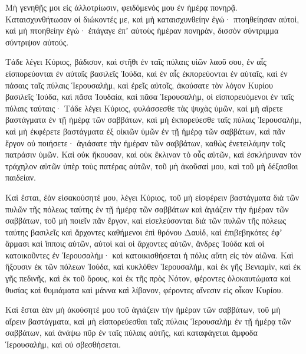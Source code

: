 {Μὴ γενηθῇς μοι εἰς ἀλλοτρίωσιν, φειδόμενός μου ἐν ἡμέρᾳ πονηρᾷ.
Καταισχυνθήτωσαν οἱ διώκοντές με, καὶ μὴ καταισχυνθείην ἐγώ· πτοηθείησαν αὐτοὶ, καὶ μὴ πτοηθείην ἐγώ· ἐπάγαγε ἐπʼ αὐτοὺς ἡμέραν πονηρὰν, δισσὸν σύντριμμα σύντριψον αὐτούς.
\par }{\PP {}Τάδε λέγει Κύριος, βάδισον, καὶ στῆθι ἐν ταῖς πύλαις υἱῶν λαοῦ σου, ἐν αἷς εἰσπορεύονται ἐν αὐταῖς βασιλεῖς Ἰούδα, καὶ ἐν αἷς ἐκπορεύονται ἐν αὐταῖς, καὶ ἐν πάσαις ταῖς πύλαις Ἱερουσαλὴμ,
καὶ ἐρεῖς αὐτοῖς, ἀκούσατε τὸν λόγον Κυρίου βασιλεῖς Ἰούδα, καὶ πᾶσα Ἰουδαία, καὶ πᾶσα Ἱερουσαλὴμ, οἱ εἰσπορευόμενοι ἐν ταῖς πύλαις ταύταις·
Τάδε λέγει Κύριος, φυλάσσεσθε τὰς ψυχὰς ὑμῶν, καὶ μὴ αἴρετε βαστάγματα ἐν τῇ ἡμέρᾳ τῶν σαββάτων, καὶ μὴ ἐκπορεύεσθε ταῖς πύλαις Ἱερουσαλὴμ,
καὶ μὴ ἐκφέρετε βαστάγματα ἐξ οἰκιῶν ὑμῶν ἐν τῇ ἡμέρᾳ τῶν σαββάτων, καὶ πᾶν ἔργον οὐ ποιήσετε· ἁγιάσατε τὴν ἡμέραν τῶν σαββάτων, καθὼς ἐνετειλάμην τοῖς πατράσιν ὑμῶν. Καὶ οὐκ ἤκουσαν, καὶ οὐκ ἔκλιναν τὸ οὖς αὐτῶν,
καὶ ἐσκλήρυναν τὸν τράχηλον αὐτῶν ὑπὲρ τοὺς πατέρας αὐτῶν, τοῦ μὴ ἀκοῦσαί μου, καὶ τοῦ μὴ δέξασθαι παιδείαν.
\par }{\PP {}Καὶ ἓσται, ἐὰν εἰσακούσητέ μου, λέγει Κύριος, τοῦ μὴ εἰσφέρειν βαστάγματα διὰ τῶν πυλῶν τῆς πόλεως ταύτης ἐν τῇ ἡμέρᾳ τῶν σαββάτων καὶ ἁγιάζειν τὴν ἡμέραν τῶν σαββάτων, τοῦ μὴ ποιεῖν πᾶν ἔργον,
καὶ εἰσελεύσονται διὰ τῶν πυλῶν τῆς πόλεως ταύτης βασιλεῖς καὶ ἄρχοντες καθήμενοι ἐπὶ θρόνου Δαυὶδ, καὶ ἐπιβεβηκότες ἐφʼ ἅρμασι καὶ ἵπποις αὐτῶν, αὐτοὶ καὶ οἱ ἄρχοντες αὐτῶν, ἄνδρες Ἰούδα καὶ οἱ κατοικοῦντες ἐν Ἱερουσαλήμ· καὶ κατοικισθήσεται ἡ πόλις αὕτη εἰς τὸν αἰῶνα.
Καὶ ἥξουσιν ἐκ τῶν πόλεων Ἰούδα, καὶ κυκλόθεν Ἱερουσαλὴμ, καὶ ἐκ γῆς Βενιαμὶν, καὶ ἐκ γῆς πεδινῆς, καὶ ἐκ τοῦ ὄρους, καὶ ἐκ τῆς πρὸς Νότον, φέροντες ὁλοκαυτώματα καὶ θυσίας καὶ θυμιάματα καὶ μάννα καὶ λίβανον, φέροντες αἴνεσιν εἰς οἶκον Κυρίου.
\par }{\PP {}Καὶ ἔσται ἐὰν μὴ ἀκούσητέ μου τοῦ ἁγιάζειν τὴν ἡμέραν τῶν σαββάτων, τοῦ μὴ αἴρειν βαστάγματα, καὶ μὴ εἰσπορεύεσθαι ταῖς πύλαις Ἱερουσαλὴμ ἐν τῇ ἡμέρᾳ τῶν σαββάτων, καὶ ἀνάψω πῦρ ἐν ταῖς πύλαις αὐτῆς, καὶ καταφάγεται ἄμφοδα Ἱερουσαλὴμ, καὶ οὐ σβεσθήσεται.

}
